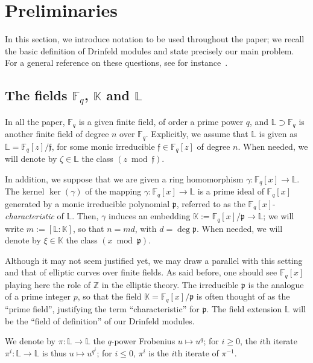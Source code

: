\documentclass[sigconf]{acmart}
\newcommand{\K}{\mathbb{K}}
\newcommand{\F}{\mathbb{F}}
\newcommand{\Z}{\mathbb{Z}}
\renewcommand{\L}{\mathbb{L}}
\newcommand{\frakf}{\mathfrak{f}}
\newcommand{\frakp}{\mathfrak{p}}
\begin{document}

\section{Preliminaries}

In this section, we introduce notation to be used throughout the
paper; we recall the basic definition of Drinfeld modules and state
precisely our main problem. For a general reference on these
questions, see for instance~\cite{Goss96}.


\subsection{The fields $\F_q$, $\K$ and $\L$}\label{ssec:not}

In all the paper, $\F_q$ is a given finite field, of order a prime
power $q$, and $\L \supset \F_q$ is another finite field of degree $n$
over $\F_q$. Explicitly, we assume that $\L$ is given as
$\L=\F_q[z]/\frakf$, for some monic irreducible $\frakf \in \F_q[z]$ of
degree $n$. When needed, we will denote by $\zeta \in \L$ the class $(z \bmod
\frakf)$.

In addition, we suppose that we are given a ring homomorphism $\gamma:
\F_q[x] \to \L$. The kernel $\ker(\gamma)$ of the mapping $\gamma:
\F_q[x] \to \L$ is a prime ideal of $\F_q[x]$ generated by a monic
irreducible polynomial $\frakp$, referred to as the
$\F_q[x]$-\textit{characteristic} of $\L$. Then, $\gamma$ induces an
embedding $\K := \F_q[x]/\frakp \to \L$; we will write $m := [\L :
  \K]$, so that $n = md$, with $d=\deg \frakp$. When needed, we will
denote by $\xi \in \K$ the class $(x \bmod \frakp)$.

Although it may not seem justified yet, we may draw a parallel with
this setting and that of elliptic curves over finite fields. As said
before, one should see $\F_q[x]$ playing here the role of $\Z$ in the
elliptic theory. The irreducible $\frakp$ is the analogue of a prime
integer $p$, so that the field $\K = \F_q[x]/\frakp$ is often thought
of as the ``prime field'', justifying the term ``characteristic'' for
$\frakp$. The field extension $\L$ will be the ``field of
definition'' of our Drinfeld modules.

We denote by $\pi: \L \to \L$ the $q$-power Frobenius $u \mapsto u^q$;
for $i \ge 0$, the $i$th iterate $\pi^i: \L \to \L$ is thus $u \mapsto
u^{q^i}$; for $i \le 0$, $\pi^i$ is the $i$th iterate of $\pi^{-1}$.
\end{document}
